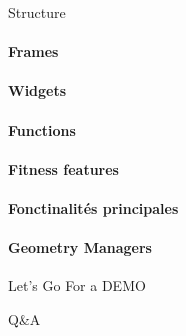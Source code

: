 \documentclass{beamer}
\begin{document}
    \begin{frame}{Structure}
        \paragraph{Frames}
        \paragraph{Widgets}
        \paragraph{Functions}
        \paragraph{Fitness features}
        \paragraph{Fonctinalités principales}
        \paragraph{Geometry Managers}
    \end{frame}

    \begin{frame}{Let's Go For a DEMO}
        \LARGE 
    \end{frame}

    \begin{frame}{Q\&A}
    \end{frame}
\end{document}
